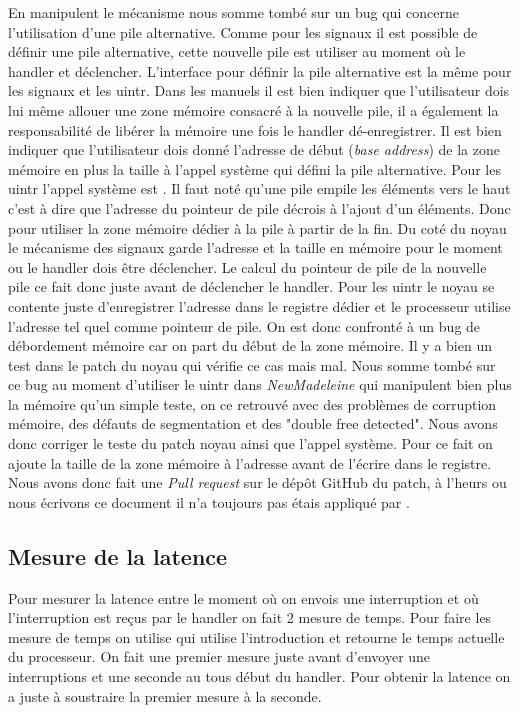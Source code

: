 En manipulent le mécanisme nous somme tombé sur un bug qui concerne l'utilisation d'une pile alternative.
Comme pour les signaux il est possible de définir une pile alternative, cette nouvelle pile est utiliser au moment où le handler et déclencher.
L'interface pour définir la pile alternative est la même pour les signaux et les uintr.
Dans les manuels il est bien indiquer que l'utilisateur dois lui même allouer une zone mémoire consacré à la nouvelle pile, il a également la responsabilité de libérer la mémoire une fois le handler dé-enregistrer.
Il est bien indiquer que l'utilisateur dois donné l'adresse de début (\emph{base address}) de la zone mémoire en plus la taille à l'appel système qui défini la pile alternative.
Pour les uintr l'appel système est .
Il faut noté qu'une pile empile les éléments vers le haut c'est à dire que l'adresse du pointeur de pile décrois à l'ajout d'un éléments.
Donc pour utiliser la zone mémoire dédier à la pile à partir de la fin.
Du coté du noyau le mécanisme des signaux garde l'adresse et la taille en mémoire pour le moment ou le handler dois être déclencher.
Le calcul du pointeur de pile de la nouvelle pile ce fait donc juste avant de déclencher le handler.
Pour les uintr le noyau se contente juste d'enregistrer l'adresse dans le registre dédier  et le processeur utilise l'adresse tel quel comme pointeur de pile.
On est donc confronté à un bug de débordement mémoire car on part du début de la zone mémoire.
Il y a bien un test dans le patch du noyau qui vérifie ce cas mais mal.
Nous somme tombé sur ce bug au moment d'utiliser le uintr dans \emph{NewMadeleine} qui manipulent bien plus la mémoire qu'un simple teste, on ce retrouvé avec des problèmes de corruption mémoire, des défauts de segmentation et des "double free detected".
Nous avons donc corriger le teste du patch noyau ainsi que l'appel système.
Pour ce fait on ajoute la taille de la zone mémoire à l'adresse avant de l'écrire dans le registre.
Nous avons donc fait une \emph{Pull request} sur le dépôt GitHub du patch, à l'heurs ou nous écrivons ce document il n'a toujours pas étais appliqué par \intel{}.

\subsection{Mesure de la latence}
\label{sec:latencyMesure}

Pour mesurer la latence entre le moment où on envois une interruption et où l'interruption est reçus par le handler on fait 2 mesure de temps.
Pour faire les mesure de temps on utilise  qui utilise l'introduction  et retourne le temps actuelle du processeur.
On fait une premier mesure juste avant d'envoyer une interruptions et une seconde au tous début du handler.
Pour obtenir la latence on a juste à soustraire la premier mesure à la seconde.


